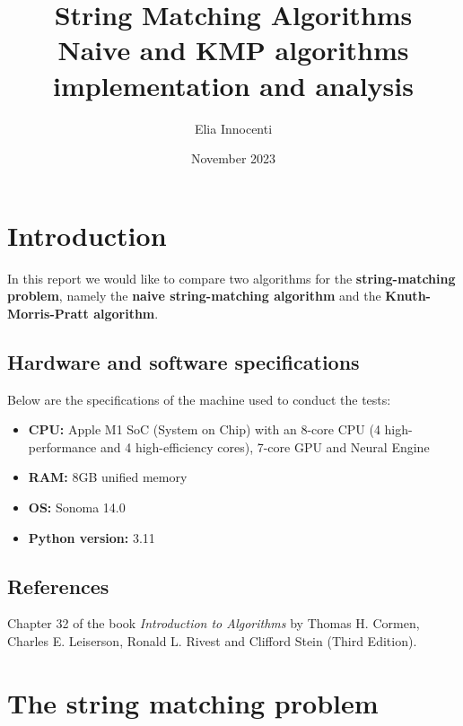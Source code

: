 \documentclass[11pt]{article}
\title{String Matching Algorithms \\
       \vspace{0.5em}
       \large Naive and KMP algorithms implementation and analysis}
\author{Elia Innocenti}
\date{November 2023}
\begin{document}
    \maketitle
    \tableofcontents

    \newpage

    \section{Introduction} \label{sec:introduction}

        In this report we would like to compare two algorithms for the \textbf{string-matching problem}, namely the \textbf{naive string-matching algorithm} and the \textbf{Knuth-Morris-Pratt algorithm}.

        \subsection{Hardware and software specifications} \label{subsec:hardware_software}

            Below are the specifications of the machine used to conduct the tests:
            \begin{itemize}
                \item \textbf{CPU:} Apple M1 SoC (System on Chip) with an 8-core CPU (4 high-performance and 4 high-efficiency cores), 7-core GPU and Neural Engine
                \item \textbf{RAM:} 8GB unified memory
                \item \textbf{OS:} Sonoma 14.0
                \item \textbf{Python version:} 3.11
            \end{itemize}

        \subsection{References} \label{subsec:references}

            Chapter 32 of the book \textit{Introduction to Algorithms} by Thomas H. Cormen, Charles E. Leiserson, Ronald L. Rivest and Clifford Stein (Third Edition).

    \section{The string matching problem} \label{sec:string_matching_problem}
\end{document}
